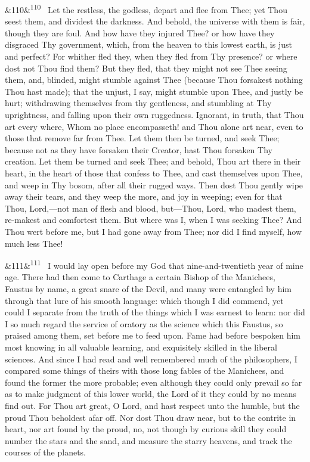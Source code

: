 \documentclass[12pt]{article}
\newcommand{\para}[1][]{\par\noindent\ifx&#1&\else\textsuperscript{\footnotesize #1}~\fi}
\begin{document}
\para[110] Let the restless, the godless, depart and flee from Thee; yet Thou seest them, and dividest the darkness. And behold, the universe with them is fair, though they are foul. And how have they injured Thee? or how have they disgraced Thy government, which, from the heaven to this lowest earth, is just and perfect? For whither fled they, when they fled from Thy presence? or where dost not Thou find them? But they fled, that they might not see Thee seeing them, and, blinded, might stumble against Thee (because Thou forsakest nothing Thou hast made); that the unjust, I say, might stumble upon Thee, and justly be hurt; withdrawing themselves from thy gentleness, and stumbling at Thy uprightness, and falling upon their own ruggedness. Ignorant, in truth, that Thou art every where, Whom no place encompasseth! and Thou alone art near, even to those that remove far from Thee. Let them then be turned, and seek Thee; because not as they have forsaken their Creator, hast Thou forsaken Thy creation. Let them be turned and seek Thee; and behold, Thou art there in their heart, in the heart of those that confess to Thee, and cast themselves upon Thee, and weep in Thy bosom, after all their rugged ways. Then dost Thou gently wipe away their tears, and they weep the more, and joy in weeping; even for that Thou, Lord,---not man of flesh and blood, but---Thou, Lord, who madest them, re-makest and comfortest them. But where was I, when I was seeking Thee? And Thou wert before me, but I had gone away from Thee; nor did I find myself, how much less Thee!

\para[111] I would lay open before my God that nine-and-twentieth year of mine age. There had then come to Carthage a certain Bishop of the Manichees, Faustus by name, a great snare of the Devil, and many were entangled by him through that lure of his smooth language: which though I did commend, yet could I separate from the truth of the things which I was earnest to learn: nor did I so much regard the service of oratory as the science which this Faustus, so praised among them, set before me to feed upon. Fame had before bespoken him most knowing in all valuable learning, and exquisitely skilled in the liberal sciences. And since I had read and well remembered much of the philosophers, I compared some things of theirs with those long fables of the Manichees, and found the former the more probable; even although they could only prevail so far as to make judgment of this lower world, the Lord of it they could by no means find out. For Thou art great, O Lord, and hast respect unto the humble, but the proud Thou beholdest afar off. Nor dost Thou draw near, but to the contrite in heart, nor art found by the proud, no, not though by curious skill they could number the stars and the sand, and measure the starry heavens, and track the courses of the planets.
\end{document}
